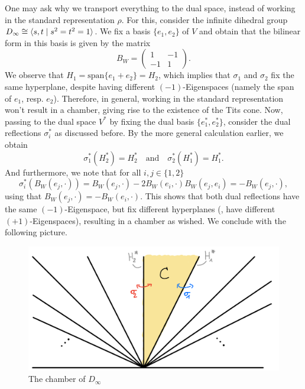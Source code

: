 \begin{remark} %
    One may ask why we transport everything to the dual space, instead of working in the standard representation \(\rho\).
    For this, consider the infinite dihedral group \(D_\infty \cong \langle s, t\;\vert\;s^2 = t^2 = 1\rangle\).
    We fix a basis \(\{e_1, e_2\}\) of \(V\) and obtain that the bilinear form in this basis is given by the matrix
    \begin{equation*}
        B_W = \begin{pmatrix}
            1  & -1 \\
            -1 & 1
        \end{pmatrix}.
    \end{equation*}
    We observe that \(H_1 = \text{span}\{e_1 + e_2\} = H_2\), which implies that \(\sigma_1\) and \(\sigma_2\) fix the same hyperplane, despite having different \((-1)\)-Eigenspaces (namely the span of \(e_1\), resp. \(e_2\)).
    Therefore, in general, working in the standard representation won't result in a chamber, giving rise to the existence of the Tits cone.
    Now, passing to the dual space \(V^*\) by fixing the dual basis \(\{e_1^*, e_2^*\}\), consider the dual reflections \(\sigma_i^*\) as discussed before.
    By the more general calculation earlier, we obtain
    \[\sigma_1^*(H_2^*) = H_2^* \quad\text{and}\quad \sigma_2^*(H_1^*) = H_1^*.\]
    And furthermore, we note that for all \(i,j\in\{1,2\}\)
    \[\sigma_i^*(B_W(e_j,\cdot)) = B_W(e_j,\cdot) - 2B_W(e_i,\cdot)B_W(e_j,e_i) = - B_W(e_j,\cdot),\]
    using that \(B_W(e_j,\cdot) = -B_W(e_i,\cdot)\).
    This shows that both dual reflections have the same \((-1)\)-Eigenspace, but fix different hyperplanes (\ie, have different \((+1)\)-Eigenspaces), resulting in a chamber as wished.
    We conclude with the following picture.\vspace*{1cm}
    \begin{figure}[h!]
        \label{fig:firstchamber}
        \centering
        \includegraphics[width=.75\textwidth]{gfx/Chamber of Dinfty.png}
        \caption{The chamber of \(D_\infty\)}
    \end{figure}
\end{remark}
    

